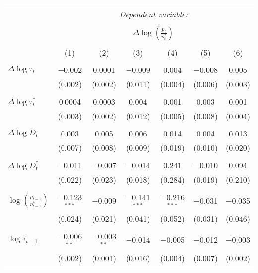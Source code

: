 
\begin{tabular}{@{\extracolsep{5pt}}lcccccc} 
\\[-1.8ex]\hline 
\hline \\[-1.8ex] 
 & \multicolumn{6}{c}{\textit{Dependent variable:}} \\ 
\cline{2-7} 
\\[-1.8ex] & \multicolumn{6}{c}{$\Delta \log \left(\frac{p_t}{p_t^*} \right)$} \\ 
\\[-1.8ex] & (1) & (2) & (3) & (4) & (5) & (6)\\ 
\hline \\[-1.8ex] 
 $\Delta \log \tau_t$ & $-$0.002 & 0.0001 & $-$0.009 & 0.004 & $-$0.008 & 0.005 \\ 
  & (0.002) & (0.002) & (0.011) & (0.004) & (0.006) & (0.003) \\ 
  & & & & & & \\ 
 $\Delta \log \tau_t^*$ & 0.0004 & 0.0003 & 0.004 & 0.001 & 0.003 & 0.001 \\ 
  & (0.003) & (0.002) & (0.012) & (0.005) & (0.008) & (0.004) \\ 
  & & & & & & \\ 
 $\Delta \log D_t$ & 0.003 & 0.005 & 0.006 & 0.014 & 0.004 & 0.013 \\ 
  & (0.007) & (0.008) & (0.009) & (0.019) & (0.010) & (0.020) \\ 
  & & & & & & \\ 
 $\Delta \log D_t^*$ & $-$0.011 & $-$0.007 & $-$0.014 & 0.241 & $-$0.010 & 0.094 \\ 
  & (0.022) & (0.023) & (0.018) & (0.284) & (0.019) & (0.210) \\ 
  & & & & & & \\ 
 $\log \left(\frac{p_{t-1}}{p_{t-1}^*} \right)$ & $-$0.123$^{***}$ & $-$0.009 & $-$0.141$^{***}$ & $-$0.216$^{***}$ & $-$0.031 & $-$0.035 \\ 
  & (0.024) & (0.021) & (0.041) & (0.052) & (0.031) & (0.046) \\ 
  & & & & & & \\ 
 $\log \tau_{t-1}$ & $-$0.006$^{**}$ & $-$0.003$^{**}$ & $-$0.014 & $-$0.005 & $-$0.012 & $-$0.003 \\ 
  & (0.002) & (0.001) & (0.016) & (0.004) & (0.007) & (0.002) \\ 
  & & & & & & \\ 

\end{tabular}
